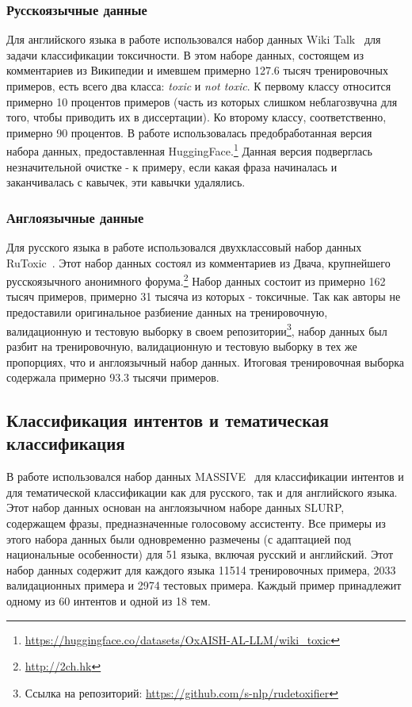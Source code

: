 \subsubsection{Русскоязычные данные}
Для английского языка в работе использовался набор данных {Wiki Talk}~\cite{toxic} для задачи классификации токсичности. В этом наборе данных, состоящем из комментариев из Википедии и имевшем примерно 127.6 тысяч тренировочных примеров, есть всего два класса: \textit{toxic} и \textit{not toxic}. К первому классу относится примерно 10 процентов примеров (часть из которых слишком неблагозвучна для того, чтобы приводить их в диссертации). Ко второму классу, соответственно, примерно 90 процентов.  В работе использовалась предобработанная версия набора данных, предоставленная HuggingFace.\footnote{\url{https://huggingface.co/datasets/OxAISH-AL-LLM/wiki_toxic}} Данная версия подверглась незначительной очистке - к примеру, если какая фраза начиналась и заканчивалась с кавычек, эти кавычки удалялись.
\subsubsection{Англоязычные данные}
Для русского языка в работе использовался двухклассовый набор данных {RuToxic}~\cite{ru_toxic}. Этот набор данных состоял из комментариев из Двача, крупнейшего русскоязычного анонимного форума.\footnote{\url{http://2ch.hk}} Набор данных состоит из примерно 162 тысяч примеров, примерно 31 тысяча из которых - токсичные. Так как авторы не предоставили оригинальное разбиение данных на тренировочную, валидационную и тестовую выборку в своем репозитории\footnote{Ссылка на репозиторий: \url{https://github.com/s-nlp/rudetoxifier}}, набор данных был разбит на тренировочную, валидационную и тестовую выборку в тех же пропорциях, что и англоязычный набор данных. Итоговая тренировочная выборка содержала примерно 93.3 тысячи примеров.

\subsection{Классификация интентов и тематическая классификация }
В работе использовался набор данных {MASSIVE}~\cite{massive} для классификации интентов и для тематической классификации как для русского, так и для английского языка. Этот набор данных основан на англоязычном наборе данных SLURP\cite{slurp}, содержащем фразы, предназначенные голосовому ассистенту.
 Все примеры из этого набора данных были одновременно размечены (с адаптацией под национальные особенности) для 51 языка, включая русский и английский. Этот набор данных содержит для каждого языка 11514 тренировочных примера, 2033 валидационных примера и 2974 тестовых примера. Каждый пример принадлежит одному из 60 интентов и одной из 18 тем. 

